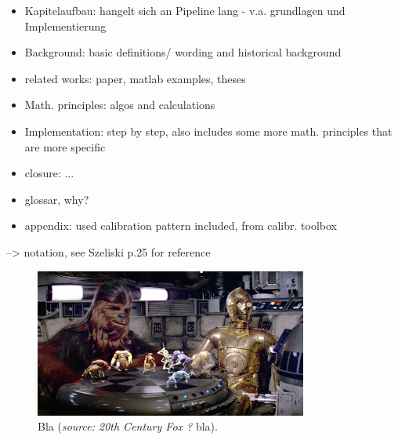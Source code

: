 
\begin{itemize}
\item Kapitelaufbau: hangelt sich an Pipeline lang - v.a. grundlagen und Implementierung
\item Background: basic definitions/ wording and historical background
\item related works: paper, matlab examples, theses
\item Math. principles: algos and calculations
\item Implementation: step by step, also includes some more math. principles that are more specific
\item closure: ...
\item glossar, why?
\item appendix: used calibration pattern included, from calibr. toolbox
\end{itemize}

--> notation, see Szeliski p.25 for reference


\begin{figure}[htbp]
		\centering
		\includegraphics[width=0.8\textwidth]{figures/starWars}
		\caption[Bla]{Bla (\textit{source: 20th Century Fox ?} bla).}
		\label{fig:starWars}
\end{figure}

